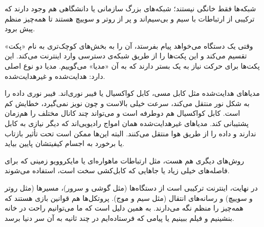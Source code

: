 شبکه‌ها فقط خانگی نیستند؛ شبکه‌های بزرگ سازمانی یا دانشگاهی هم وجود دارند که ترکیبی از ارتباطات با سیم و بی‌سیم‌اند و پر از روتر و سوییچ هستند تا همه‌چیز منظم پیش برود.  

وقتی یک دستگاه می‌خواهد پیام بفرستد، آن را به بخش‌های کوچک‌تری به نام «پکت» تقسیم می‌کند و این پکت‌ها را از طریق شبکه‌ی دسترسی وارد اینترنت می‌کند. این پکت‌ها برای حرکت نیاز به یک بستر دارند که به آن «مدیا» می‌گوییم. مدیا دو نوع اصلی دارد: هدایت‌شده و غیرهدایت‌شده.  

مدیاهای هدایت‌شده مثل کابل مسی، کابل کواکسیال یا فیبر نوری‌اند. فیبر نوری داده را به شکل نور منتقل می‌کند، سرعت خیلی بالاست و چون نویز نمی‌گیرد، خطایش کم است. کابل کواکسیال هم دوطرفه است و می‌تواند چند کانال مختلف را هم‌زمان پشتیبانی کند.  
مدیاهای غیرهدایت‌شده همان امواج رادیویی‌اند که دیگر نیازی به کابل ندارند و داده را از طریق هوا منتقل می‌کنند. البته این‌ها ممکن است تحت تأثیر بازتاب یا برخورد به اجسام کیفیتشان پایین بیاید.  

روش‌های دیگری هم هست، مثل ارتباطات ماهواره‌ای یا مایکروویو زمینی که برای فاصله‌های خیلی زیاد یا جاهایی که کابل‌کشی سخت است، استفاده می‌شوند.  

در نهایت، اینترنت ترکیبی است از دستگاه‌ها (مثل گوشی و سرور)، مسیرها (مثل روتر و سوییچ) و رسانه‌های انتقال (مثل سیم و موج). پروتکل‌ها هم قوانین بازی هستند که همه‌چیز را منظم نگه می‌دارند. به همین دلیل است که ما می‌توانیم راحت در خانه بنشینیم و فیلم ببینیم یا پیامی که فرستاده‌ایم در چند ثانیه به آن سر دنیا برسد.  
